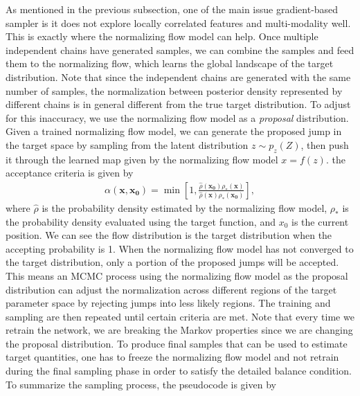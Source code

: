 \documentclass[twocolumn]{aastex631}
\begin{document}
As mentioned in the previous subsection, one of the main issue gradient-based
sampler is it does not explore locally correlated features and multi-modality well. This
is exactly where the normalizing flow model can help. Once multiple independent
chains have generated samples, we can combine the samples and feed them to the
normalizing flow, which learns the global landscape of the target
distribution. Note that since the independent chains are generated with the same
number of samples, the normalization between posterior density represented by
different chains is in general different from the true target distribution. To
adjust for this inaccuracy, we use the normalizing flow model as a
\textit{proposal} distribution. Given a trained normalizing flow model, we can
generate the proposed jump in the target space by sampling from the latent
distribution $z \sim p_z(Z)$, then push it through the learned map given by the
normalizing flow model $x=f(z)$. the acceptance criteria is given by
\begin{align}
    \alpha(\mathbf{x},\mathbf{x_0}) = \min \left[ 1, \frac{\hat{\rho}(\mathbf{x_0})\rho_*(\mathbf{x})}{\hat{\rho}(\mathbf{x})\rho_*(\mathbf{x_0})}\right],
\end{align}
where $\hat{\rho}$ is the probability density estimated by the normalizing flow
model, $\rho_*$ is the probability density evaluated using the target function,
and $x_0$ is the current position. We can see the flow distribution is the
target distribution when the accepting probability is 1. When the normalizing
flow model has not converged to the target distribution, only a portion of the
proposed jumps will be accepted. This means an MCMC process using the
normalizing flow model as the proposal distribution can adjust the normalization
across different regions of the target parameter space by rejecting jumps into
less likely regions. The training and sampling are then repeated until certain
criteria are met. Note that every time we retrain the network, we are breaking
the Markov properties since we are changing the proposal distribution. To
produce final samples that can be used to estimate target quantities, one has to
freeze the normalizing flow model and not retrain during the final sampling
phase in order to satisfy the detailed balance condition. To summarize the
sampling process, the pseudocode is given by
\end{document}
